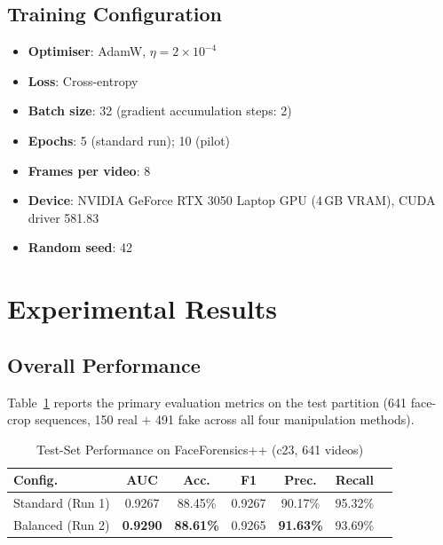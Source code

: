 \documentclass[conference]{IEEEtran}
\begin{document}
\subsection{Training Configuration}
\label{sec:training}

\begin{itemize}
  \item \textbf{Optimiser}: AdamW, $\eta = 2 \times 10^{-4}$
  \item \textbf{Loss}: Cross-entropy
  \item \textbf{Batch size}: 32 (gradient accumulation steps: 2)
  \item \textbf{Epochs}: 5 (standard run); 10 (pilot)
  \item \textbf{Frames per video}: 8
  \item \textbf{Device}: NVIDIA GeForce RTX 3050 Laptop GPU (4\,GB VRAM), CUDA driver 581.83
  \item \textbf{Random seed}: 42
\end{itemize}

\section{Experimental Results}
\label{sec:results}

\subsection{Overall Performance}
\label{sec:overall}

Table~\ref{tab:overall} reports the primary evaluation metrics on the test partition 
(641 face-crop sequences, 150 real $+$ 491 fake across all four manipulation methods).

\begin{table}[t]
  \centering
  \caption{Test-Set Performance on FaceForensics++ (c23, 641 videos)}
  \label{tab:overall}
  \begin{tabular}{lcccccc}
    \toprule
    \textbf{Config.} & \textbf{AUC} & \textbf{Acc.} & \textbf{F1} & \textbf{Prec.} & \textbf{Recall} \\
    \midrule
    Standard (Run 1)  & 0.9267 & 88.45\% & 0.9267 & 90.17\% & 95.32\% \\
    Balanced (Run 2)  & \textbf{0.9290} & \textbf{88.61\%} & 0.9265 & \textbf{91.63\%} & 93.69\% \\
    \bottomrule
  \end{tabular}
\end{table}
\end{document}
